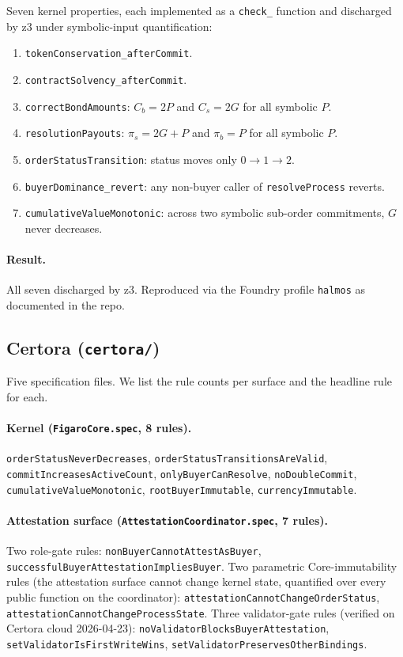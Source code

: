 \documentclass[11pt,a4paper]{article}
\theoremstyle{definition}
\theoremstyle{remark}
\newcommand{\pay}{P}
\newcommand{\cumval}{G}
\newcommand{\bbond}{C_b}
\newcommand{\sbond}{C_s}
\begin{document}
Seven kernel properties, each implemented as a \texttt{check\_}
function and discharged by z3 under symbolic-input quantification:
\begin{enumerate}[label=\textbf{H\arabic*}]
  \item \texttt{tokenConservation\_afterCommit}.
  \item \texttt{contractSolvency\_afterCommit}.
  \item \texttt{correctBondAmounts}: $\bbond = 2\pay$ and
    $\sbond = 2\cumval$ for all symbolic $\pay$.
  \item \texttt{resolutionPayouts}: $\pi_s = 2\cumval + \pay$ and
    $\pi_b = \pay$ for all symbolic $\pay$.
  \item \texttt{orderStatusTransition}: status moves only
    $0 \to 1 \to 2$.
  \item \texttt{buyerDominance\_revert}: any non-buyer caller of
    \texttt{resolveProcess} reverts.
  \item \texttt{cumulativeValueMonotonic}: across two symbolic
    sub-order commitments, $\cumval$ never decreases.
\end{enumerate}

\paragraph{Result.}
All seven discharged by z3. Reproduced via the Foundry profile
\texttt{halmos} as documented in the repo.

\subsection{Certora (\texttt{certora/})}

Five specification files. We list the rule counts per surface and
the headline rule for each.

\paragraph{Kernel (\texttt{FigaroCore.spec}, 8 rules).}
\texttt{orderStatusNeverDecreases},
\texttt{orderStatusTransitionsAreValid},
\texttt{commitIncreasesActiveCount},
\texttt{onlyBuyerCanResolve},
\texttt{noDoubleCommit},
\texttt{cumulativeValueMonotonic},
\texttt{rootBuyerImmutable},
\texttt{currencyImmutable}.

\paragraph{Attestation surface (\texttt{AttestationCoordinator.spec}, 7 rules).}
Two role-gate rules:
\texttt{nonBuyerCannotAttestAsBuyer},
\texttt{successfulBuyerAttestationImpliesBuyer}.
Two parametric Core-immutability rules (the attestation surface cannot
change kernel state, quantified over every public function on the
coordinator):
\texttt{attestationCannotChangeOrderStatus},
\texttt{attestationCannotChangeProcessState}.
Three validator-gate rules (verified on Certora cloud
2026-04-23):
\texttt{noValidatorBlocksBuyerAttestation},
\texttt{setValidatorIsFirstWriteWins},
\texttt{setValidatorPreservesOtherBindings}.
\end{document}
